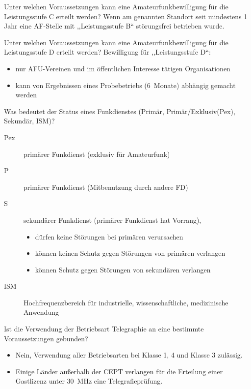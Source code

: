 \documentclass[avery5371,grid,frame,a4paper]{flashcards}
\newcommand{\card}[3]{
  \begin{flashcard}[{\chap} -- #1]{#2}#3\end{flashcard}
}
\begin{document}
\card{43}{Unter welchen Voraussetzungen kann eine Amateurfunkbewilligung für die Leistungsstufe C erteilt werden?}{
  Wenn am genannten Standort seit mindestens 1 Jahr eine AF-Stelle mit ,,Leistungsstufe B`` störungsfrei betrieben wurde.
}

\card{44}{Unter welchen Voraussetzungen kann eine Amateurfunkbewilligung für die Leistungsstufe D erteilt werden?}{
  Bewilligung für ,,Leistungsstufe D``:
  \begin{itemize}
    \item nur AFU-Vereinen und im öffentlichen Interesse tätigen Organisationen
    \item kann von Ergebnissen eines Probebetriebs (6~Monate) abhängig gemacht werden
  \end{itemize}
}

\card{45}{Was bedeutet der Status eines Funkdienstes (Primär, Primär/Exklusiv(Pex), Sekundär, ISM)?}{
 \footnotesize
  \begin{description}
    \item[Pex] primärer Funkdienst (exklusiv für Amateurfunk)
    \item[P] primärer Funkdienst (Mitbenutzung durch andere FD)
    \item[S] sekundärer Funkdienst (primärer Funkdienst hat Vorrang),
      \begin{itemize}[leftmargin=0pt,itemsep=0pt]
        \item dürfen keine Störungen bei primären verursachen
        \item können keinen Schutz gegen Störungen von primären verlangen
        \item können Schutz gegen Störungen von sekundären verlangen
      \end{itemize}
    \item[ISM] Hochfrequenzbereich für industrielle, wissenschaftliche, medizinische Anwendung
  \end{description}
}

\card{46}{Ist die Verwendung der Betriebsart Telegraphie an eine bestimmte Voraussetzungen gebunden?}{
  \begin{itemize}
    \item Nein, Verwendung aller Betriebsarten bei Klasse 1, 4 und Klasse 3 zulässig.
    \item Einige Länder außerhalb der CEPT verlangen für die Erteilung einer Gastlizenz unter \SI{30}{\mega\Hz} eine Telegrafieprüfung.
  \end{itemize}
}
\end{document}
